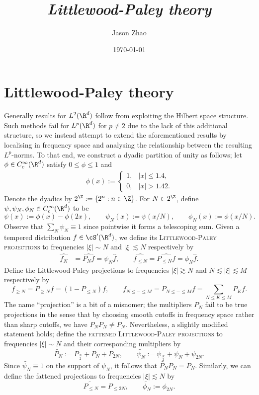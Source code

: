 \documentclass[reqno]{amsart}
\title
{
	\emph{Littlewood-Paley theory}
}
\author{Jason Zhao}
\date{\today}
\theoremstyle{definition}
\theoremstyle{remark}
\renewcommand{\emph}{\textsc}
\begin{document}
\maketitle


\tableofcontents
	
\section{Littlewood-Paley theory}

Generally results for $L^2 (\R^d)$ follow from exploiting the Hilbert space structure. Such methods fail for $L^p (\R^d)$ for $p \neq 2$ due to the lack of this additional structure, so we instead attempt to extend the aforementioned results by localising in frequency space and analysing the relationship between the resulting $L^p$-norms. To that end, we construct a dyadic partition of unity as follows; let $\phi  \in C^\infty_c (\R^d)$ satisfy $0 \leq \phi \leq 1$ and 
\begin{align*}
	\phi(x) 
		:= 
		\begin{cases}
			1 , 				&|x| \leq 1.4, \\
			0, 				&|x| > 1.42. 
		\end{cases}
\end{align*}
Denote the dyadics by $2^\Z := \{ 2^n : n \in \Z \}$. For $N \in 2^\Z$, define $\psi, \psi_N, \phi_N \in C^\infty_c (\R^d)$ to be 
	\[ \psi(x) := \phi(x) - \phi(2x), \qquad \psi_N (x) := \psi(x/N), \qquad \phi_N (x) := \phi(x/N).  \]
Observe that $\sum_N \psi_N \equiv 1$ since pointwise it forms a telescoping sum. Given a tempered distribution $f \in \cS' (\R^d)$, we define its \emph{Littlewood-Paley projections} to frequencies $|\xi| \sim N$ and $|\xi| \lesssim N$ respectively by
	\begin{align*}
		\widehat{f_N} &= \widehat{P_N f}  = \psi_N \widehat f , \qquad
		\widehat{f_{\leq N}} = \widehat{P_{\leq N} f} = \phi_N \widehat f.
	\end{align*}	
Define the Littlewood-Paley projections to frequencies $|\xi| \gtrsim N$ and $N \lesssim |\xi| \lesssim M$ respectively by 
	\[ f_{\geq N} = P_{\geq N} f = (1 - P_{\leq N}) f, \qquad f_{N \leq - \leq M} = P_{N \leq - \leq M} f = \sum_{N \leq K \leq M} P_K f. \]
The name ``projection'' is a bit of a misnomer; the multipliers $P_N$ fail to be true projections in the sense that by choosing smooth cutoffs in frequency space rather than sharp cutoffs, we have $P_N P_N \neq P_N$. Nevertheless, a slightly modified statement holds; define the \emph{fattened Littlewood-Paley projections} to frequencies $|\xi| \sim N$ and their corresponding multipliers by
	\[ \widetilde{P_N} := P_{\frac{N}{2}} + P_{N} + P_{2N},\qquad  \widetilde{\psi_N} := \psi_{\frac{N}{2}} + \psi_N + \psi_{2N}. \]
Since $\widetilde{\psi_N} \equiv 1$ on the support of $\psi_N$, it follows that $\widetilde{P_N} P_N = P_N$. Similarly, we can define the fattened projections to frequencies $|\xi| \lesssim N$ by 
	\[ \widetilde{P_{\leq N}} = P_{\leq 2N}, \qquad \widetilde{\phi_N} := \phi_{2N}.  \]	
\end{document}
